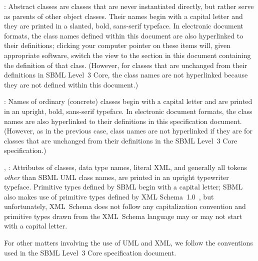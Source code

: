 \begin{description}
  
\item {}: Abstract classes are classes that
  are never instantiated directly, but rather serve as parents of other
  object classes.  Their names begin with a capital letter and they are
  printed in a slanted, bold, sans-serif typeface.  In electronic
  document formats, the class names defined within this document are
  also hyperlinked to their definitions; clicking your computer pointer
  on these items will, given appropriate software, switch the view to
  the section in this document containing the definition of that class.
  (However, for classes that are unchanged from their definitions in
  SBML Level~3 Core, the class names are not hyperlinked because they
  are not defined within this document.)
  
\item {}: Names of ordinary (concrete) classes begin with a
  capital letter and are printed in an upright, bold, sans-serif
  typeface.  In electronic document formats, the class names are also
  hyperlinked to their definitions in this specification document.
  (However, as in the previous case, class names are not hyperlinked if
  they are for classes that are unchanged from their definitions in the
  SBML Level~3 Core specification.)

\item {}, : Attributes of classes, data
  type names, literal XML, and generally all tokens \emph{other} than
  SBML UML class names, are printed in an upright typewriter typeface.
  Primitive types defined by SBML begin with a capital letter; SBML also
  makes use of primitive types defined by XML
  Schema~1.0~\citep{biron:2000,fallside:2000,thompson:2000}, but
  unfortunately, XML~Schema does not follow any capitalization
  convention and primitive types drawn from the XML~Schema language may
  or may not start with a capital letter.

\end{description}

For other matters involving the use of UML and XML, we follow the
conventions used in the SBML Level~3 Core specification document.  




